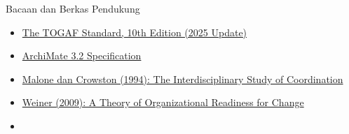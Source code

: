 \documentclass[aspectratio=169, table, 12pt]{beamer}
\begin{document}
\begin{frame}{{\Large Bacaan dan Berkas Pendukung}}
  \small
  \begin{itemize}
    \item \href{https://www.opengroup.org/togaf}{The TOGAF Standard, 10th Edition (2025 Update)}
    \item \href{https://publications.opengroup.org/standards/archimate/c226}{ArchiMate 3.2 Specification}
    \item \href{https://doi.org/10.1145/174666.174668}{Malone dan Crowston (1994): The Interdisciplinary Study of Coordination}
    \item \href{https://doi.org/10.1186/1748-5908-4-67}{Weiner (2009): A Theory of Organizational Readiness for Change}
    \item {}
  \end{itemize}
\end{frame}
\end{document}
